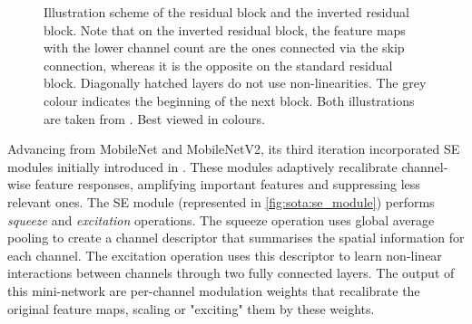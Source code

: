 \begin{figure}
    \centering
    \caption{Illustration scheme of the residual block and the inverted residual
    block. Note that on the inverted residual block, the feature maps with the lower
    channel count are the ones connected via the skip connection, whereas it is the
    opposite on the standard residual block. Diagonally hatched layers do not use
    non-linearities. The grey colour indicates the beginning of the next block. Both
    illustrations are taken from \cite{DongMobileNetV2}. Best viewed in colours.}
    \label{fig:sota:inverted_vs_residual_blocks}
\end{figure}


Advancing from MobileNet and MobileNetV2, its third iteration
\cite{DBLP:conf/iccv/HowardPALSCWCTC19} incorporated \ac{SE} modules initially
introduced in \cite{DBLP:conf/cvpr/HuSS18}. These modules adaptively recalibrate
channel-wise feature responses, amplifying important features and suppressing
less relevant ones. The \ac{SE} module (represented in
\cref{fig:sota:se_module}) performs \emph{squeeze} and \emph{excitation}
operations. The squeeze operation uses global average pooling to create a
channel descriptor that summarises the spatial information for each channel. The
excitation operation uses this descriptor to learn non-linear interactions
between channels through two fully connected layers. The output of this
mini-network are per-channel modulation weights that recalibrate the original
feature maps, scaling or "exciting" them by these weights.\\

